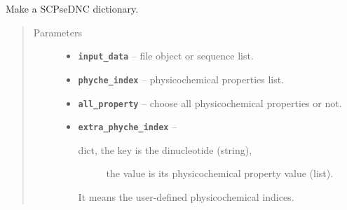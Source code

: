 \documentclass[letterpaper,10pt,english]{sphinxmanual}
\begin{document}
\begin{fulllineitems}
\label{reference/PyDNApsenac:PyDNApsenac.GetSCPseDNC}
Make a SCPseDNC dictionary.
\begin{quote}\begin{description}
\item[{Parameters}] \leavevmode\begin{itemize}
\item {} 
\textbf{\texttt{input\_data}} -- file object or sequence list.

\item {} 
\textbf{\texttt{phyche\_index}} -- physicochemical properties list.

\item {} 
\textbf{\texttt{all\_property}} -- choose all physicochemical properties or not.

\item {} 
\textbf{\texttt{extra\_phyche\_index}} -- \begin{description}
\item[{dict, the key is the dinucleotide (string),}] \leavevmode
the value is its physicochemical property value (list).

\end{description}

It means the user-defined physicochemical indices.


\end{itemize}

\end{description}\end{quote}

\end{fulllineitems}

\end{document}
